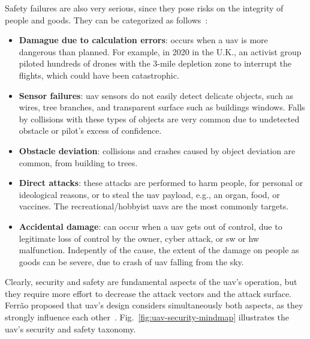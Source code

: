 Safety failures are also very serious, since they pose risks on the integrity of
people and goods. They can be categorized as follows~\cite{ferrao2020stuart}:
\begin{itemize}
\item \textbf{Damague due to calculation errors}: occurs when a \gls{uav} is
  more dangerous than planned. For example, in 2020 in the U.K., an activist
  group piloted hundreds of drones with the 3-mile depletion zone to interrupt
  the flights, which could have been catastrophic.
\item \textbf{Sensor failures}: \gls{uav} sensors do not easily detect delicate
  objects, such as wires, tree branches, and transparent surface such as
  buildings windows. Falls by collisions with these types of objects are very
  common due to undetected obstacle or pilot's excess of confidence.
\item \textbf{Obstacle deviation}: collisions and crashes caused by object
  deviation are common, from building to trees.
\item \textbf{Direct attacks}: these attacks are performed to harm people, for
  personal or ideological reasons, or to steal the \gls{uav} payload, e.g., an
  organ, food, or vaccines. The recreational/hobbyist \glspl{uav} are the most
  commonly targets.
\item \textbf{Accidental damage}: can occur when a \gls{uav} gets out of
  control, due to legitimate loss of control by the owner, cyber attack, or
  \gls{sw} or \gls{hw} malfunction. Indepently of the cause, the extent of the
  damage on people as goods can be severe, due to crash of \gls{uav} falling
  from the sky.
\end{itemize}

Clearly, security and safety are fundamental aspects of the \gls{uav}'s
operation, but they require more effort to decrease the attack vectors and the
attack surface. Ferrão proposed that \gls{uav}'s design considers simultaneously
both aspects, as they strongly influence each
other~\cite{ferrao2020stuart}. Fig.~\ref{fig:uav-security-mindmap} illustrates the
\gls{uav}'s security and safety taxonomy.

